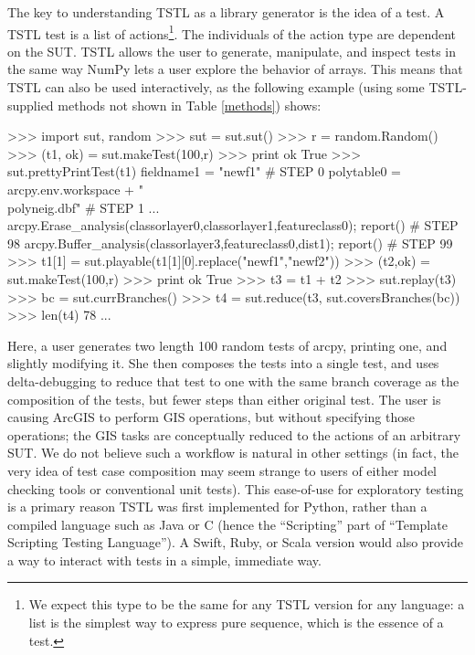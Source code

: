 The key to understanding TSTL as a library generator is the idea of a test.  A TSTL test is a list of actions\footnote{We expect this type to be the same for any TSTL version for any language:  a list is the simplest way to express pure sequence, which is the essence of a test.}.  The individuals of the action type are dependent on the SUT.  TSTL allows the user to generate, manipulate, and inspect tests in the same way NumPy lets a user explore the behavior of arrays.  This means that TSTL can also be used interactively, as the following example (using some TSTL-supplied methods not shown in Table \ref{methods}) shows:

{\scriptsize
\begin{code}
 >>> import sut, random
 >>> sut = sut.sut()
 >>> r = random.Random()
 >>> (t1, ok) = sut.makeTest(100,r)
 >>> print ok
 True
 >>> sut.prettyPrintTest(t1)
 fieldname1 = "newf1"                                                      \# STEP 0
 polytable0 = arcpy.env.workspace + "\\polyneig.dbf"                        \# STEP 1
...
 arcpy.Erase\_analysis(classorlayer0,classorlayer1,featureclass0); report() \# STEP 98
 arcpy.Buffer\_analysis(classorlayer3,featureclass0,dist1); report()        \# STEP 99
 >>> t1[1] = sut.playable(t1[1][0].replace("newf1","newf2"))
 >>> (t2,ok) = sut.makeTest(100,r)
 >>> print ok
 True
 >>> t3 = t1 + t2
 >>> sut.replay(t3)
 >>> bc = sut.currBranches()
 >>> t4 = sut.reduce(t3, sut.coversBranches(bc))
 >>> len(t4)
 78
...
\end{code}
}

Here, a user generates two length 100 random tests of arcpy, printing one, and slightly modifying it.  She then composes the tests into a single test, and uses delta-debugging to reduce that test to one with the same branch coverage as the composition of the tests, but fewer steps than either original test.  The user is causing ArcGIS to perform GIS operations, but without specifying those operations; the GIS tasks are conceptually reduced to the actions of an arbitrary SUT.  We do not believe such a workflow is natural in other settings (in fact, the very idea of test case composition may seem strange to users of either model checking tools or conventional unit tests).  This ease-of-use for exploratory testing is a primary reason TSTL was first implemented for Python, rather than a compiled language such as Java or C (hence the ``Scripting'' part of ``Template Scripting Testing Language'').  A Swift, Ruby, or Scala version would also provide a way to interact with tests in a simple, immediate way.

